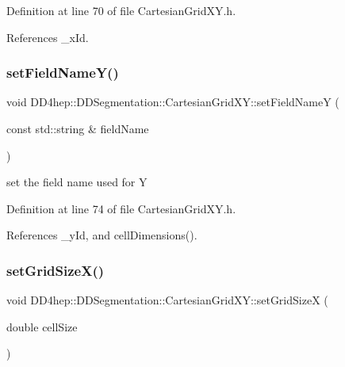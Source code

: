 Definition at line 70 of file Cartesian\+Grid\+X\+Y.\+h.



References \+\_\+x\+Id.

\hypertarget{class_d_d4hep_1_1_d_d_segmentation_1_1_cartesian_grid_x_y_a291b68b5ed0be43c141665b38aeeab52}{}\label{class_d_d4hep_1_1_d_d_segmentation_1_1_cartesian_grid_x_y_a291b68b5ed0be43c141665b38aeeab52} 
\subsubsection{\texorpdfstring{set\+Field\+Name\+Y()}{setFieldNameY()}}
{\footnotesize\ttfamily void D\+D4hep\+::\+D\+D\+Segmentation\+::\+Cartesian\+Grid\+X\+Y\+::set\+Field\+NameY (\begin{DoxyParamCaption}\item[{const std\+::string \&}]{field\+Name }\end{DoxyParamCaption})\hspace{0.3cm}{\ttfamily [inline]}}



set the field name used for Y 



Definition at line 74 of file Cartesian\+Grid\+X\+Y.\+h.



References \+\_\+y\+Id, and cell\+Dimensions().

\hypertarget{class_d_d4hep_1_1_d_d_segmentation_1_1_cartesian_grid_x_y_af4955b8d0693a3ded3a6d14defec4c9e}{}\label{class_d_d4hep_1_1_d_d_segmentation_1_1_cartesian_grid_x_y_af4955b8d0693a3ded3a6d14defec4c9e} 
\subsubsection{\texorpdfstring{set\+Grid\+Size\+X()}{setGridSizeX()}}
{\footnotesize\ttfamily void D\+D4hep\+::\+D\+D\+Segmentation\+::\+Cartesian\+Grid\+X\+Y\+::set\+Grid\+SizeX (\begin{DoxyParamCaption}\item[{double}]{cell\+Size }\end{DoxyParamCaption})\hspace{0.3cm}{\ttfamily [inline]}}



